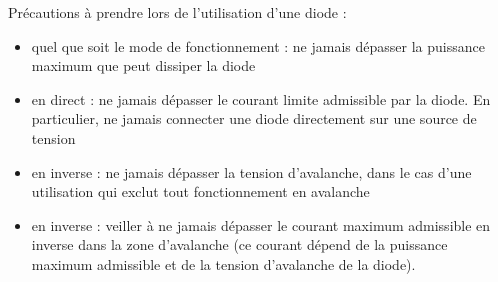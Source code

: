 \documentclass{../template/tp}
\begin{document}
{Précautions à prendre lors de l'utilisation d'une diode :
\begin{itemize}
\item quel que soit le mode de fonctionnement : ne jamais dépasser la puissance maximum que peut dissiper la diode
\item en direct : ne jamais dépasser le courant limite admissible par la diode. En particulier, ne jamais connecter une diode directement sur une source de tension
\item en inverse : ne jamais dépasser la tension d'avalanche, dans le cas d'une utilisation qui exclut tout fonctionnement en avalanche
\item en inverse : veiller à ne jamais dépasser le courant maximum admissible en inverse dans la zone d'avalanche (ce courant dépend de la puissance maximum admissible et de la tension d'avalanche de la diode).
\end{itemize}
}
\end{document}
